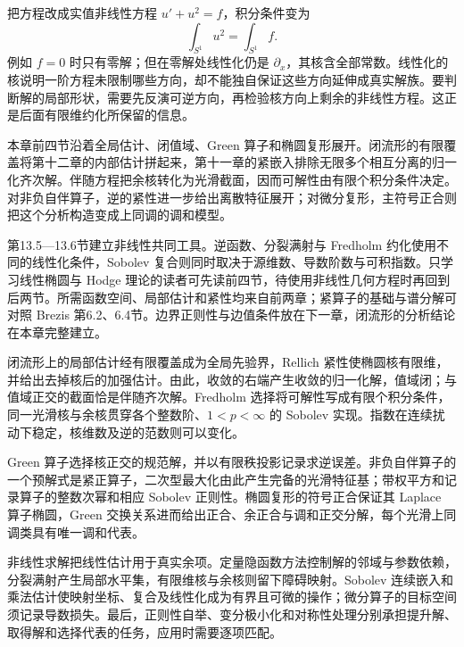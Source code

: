 \ProseParagraphBreak

把方程改成实值非线性方程 \(u'+u^2=f\)，积分条件变为
\[
	\int_{S^1}u^2=\int_{S^1}f.
\]
例如 \(f=0\) 时只有零解；但在零解处线性化仍是 \(\partial_x\)，其核含全部常数。线性化的核说明一阶方程未限制哪些方向，却不能独自保证这些方向延伸成真实解族。要判断解的局部形状，需要先反演可逆方向，再检验核方向上剩余的非线性方程。这正是后面有限维约化所保留的信息。

\ProseParagraphBreak

本章前四节沿着全局估计、闭值域、Green 算子和椭圆复形展开。闭流形的有限覆盖将第十二章的内部估计拼起来，第十一章的紧嵌入排除无限多个相互分离的归一化齐次解。伴随方程把余核转化为光滑截面，因而可解性由有限个积分条件决定。对非负自伴算子，逆的紧性进一步给出离散特征展开；对微分复形，主符号正合则把这个分析构造变成上同调的调和模型。

\ProseParagraphBreak

第13.5—13.6节建立非线性共同工具。逆函数、分裂满射与 Fredholm 约化使用不同的线性化条件，Sobolev 复合则同时取决于源维数、导数阶数与可积指数。只学习线性椭圆与 Hodge 理论的读者可先读前四节，待使用非线性几何方程时再回到后两节。所需函数空间、局部估计和紧性均来自前两章；紧算子的基础与谱分解可对照 Brezis 第6.2、6.4节\cite[第6.2、6.4节]{Brezis2011}。边界正则性与边值条件放在下一章，闭流形的分析结论在本章完整建立。








\begin{chaptersummary}
闭流形上的局部估计经有限覆盖成为全局先验界，Rellich 紧性使椭圆核有限维，并给出去掉核后的加强估计。由此，收敛的右端产生收敛的归一化解，值域闭；与值域正交的截面恰是伴随齐次解。Fredholm 选择将可解性写成有限个积分条件，同一光滑核与余核贯穿各个整数阶、\(1<p<\infty\) 的 Sobolev 实现。指数在连续扰动下稳定，核维数及逆的范数则可以变化。

\ProseParagraphBreak

Green 算子选择核正交的规范解，并以有限秩投影记录求逆误差。非负自伴算子的一个预解式是紧正算子，二次型最大化由此产生完备的光滑特征基；带权平方和记录算子的整数次幂和相应 Sobolev 正则性。椭圆复形的符号正合保证其 Laplace 算子椭圆，Green 交换关系进而给出正合、余正合与调和正交分解，每个光滑上同调类具有唯一调和代表。

\ProseParagraphBreak

非线性求解把线性估计用于真实余项。定量隐函数方法控制解的邻域与参数依赖，分裂满射产生局部水平集，有限维核与余核则留下障碍映射。Sobolev 连续嵌入和乘法估计使映射坐标、复合及线性化成为有界且可微的操作；微分算子的目标空间须记录导数损失。最后，正则性自举、变分极小化和对称性处理分别承担提升解、取得解和选择代表的任务，应用时需要逐项匹配。
\end{chaptersummary}

